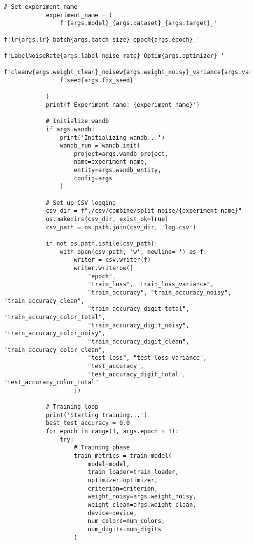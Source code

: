 \begin{lstlisting}[style=pythonstyle, caption={メインコード}]
            # Set experiment name
            experiment_name = (
                f'{args.model}_{args.dataset}_{args.target}_'
                f'lr{args.lr}_batch{args.batch_size}_epoch{args.epoch}_'
                f'LabelNoiseRate{args.label_noise_rate}_Optim{args.optimizer}_'
                f'cleanw{args.weight_clean}_noisew{args.weight_noisy}_variance{args.variance}_width{args.model_width}_'
                f'seed{args.fix_seed}'
                
            )
            print(f'Experiment name: {experiment_name}')
    
            # Initialize wandb
            if args.wandb:
                print('Initializing wandb...')
                wandb_run = wandb.init(
                    project=args.wandb_project,
                    name=experiment_name,
                    entity=args.wandb_entity,
                    config=args
                )
    
            # Set up CSV logging
            csv_dir = f"./csv/combine/split_noise/{experiment_name}"
            os.makedirs(csv_dir, exist_ok=True)
            csv_path = os.path.join(csv_dir, 'log.csv')
            
            if not os.path.isfile(csv_path):
                with open(csv_path, 'w', newline='') as f:
                    writer = csv.writer(f)
                    writer.writerow([
                        "epoch", 
                        "train_loss", "train_loss_variance",
                        "train_accuracy", "train_accuracy_noisy", "train_accuracy_clean",
                        "train_accuracy_digit_total", "train_accuracy_color_total",
                        "train_accuracy_digit_noisy", "train_accuracy_color_noisy",
                        "train_accuracy_digit_clean", "train_accuracy_color_clean",
                        "test_loss", "test_loss_variance",
                        "test_accuracy",
                        "test_accuracy_digit_total", "test_accuracy_color_total"
                    ])
    
            # Training loop
            print('Starting training...')
            best_test_accuracy = 0.0
            for epoch in range(1, args.epoch + 1):
                try:
                    # Training phase
                    train_metrics = train_model(
                        model=model,
                        train_loader=train_loader,
                        optimizer=optimizer,
                        criterion=criterion,
                        weight_noisy=args.weight_noisy,
                        weight_clean=args.weight_clean,
                        device=device,
                        num_colors=num_colors,
                        num_digits=num_digits
                    )
    

\end{lstlisting}

